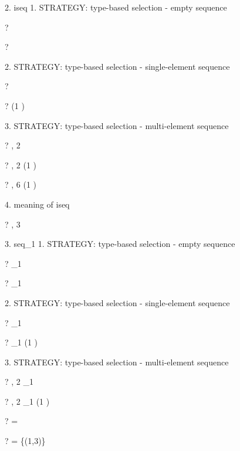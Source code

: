 \documentclass{article}
\begin{document}
 2. iseq
     1. STRATEGY: type-based selection - empty sequence
\begin{zed} \vdash? \langle \rangle \in \iseq \nat \end{zed}
\begin{zed} \vdash? \langle \rangle \in \iseq \langle \rangle \end{zed}
     2. STRATEGY: type-based selection - single-element sequence
\begin{zed} \vdash?  \rangle \in \iseq \nat \end{zed}
\begin{zed} \vdash?  \rangle \in \iseq (1 ) \end{zed}
     3. STRATEGY: type-based selection - multi-element sequence
\begin{zed} \vdash? , 2 \rangle \in \iseq \nat \end{zed}
\begin{zed} \vdash? , 2 \rangle \in \iseq (1 ) \end{zed}
\begin{zed} \vdash? , 6 \rangle \notin \iseq (1 ) \end{zed}
     4. meaning of iseq
\begin{zed} \vdash? , 3 \rangle \notin \iseq \nat \end{zed}

 3. seq_1
     1. STRATEGY: type-based selection - empty sequence
\begin{zed} \vdash? \langle \rangle \notin \seq_1 \nat \end{zed}
\begin{zed} \vdash? \langle \rangle \notin \seq_1 \langle \rangle \end{zed}
     2. STRATEGY: type-based selection - single-element sequence
\begin{zed} \vdash?  \rangle \in \seq_1 \nat \end{zed}
\begin{zed} \vdash?  \rangle \in \seq_1 (1 ) \end{zed}
     3. STRATEGY: type-based selection - multi-element sequence
\begin{zed} \vdash? , 2 \rangle \in \seq_1 \nat \end{zed}
\begin{zed} \vdash? , 2 \rangle \in \seq_1 (1 ) \end{zed}

\begin{zed} \vdash? \langle \rangle = \emptyset \end{zed}
\begin{zed} \vdash?  \rangle = \{(1,3)\} \end{zed}
\end{document}
